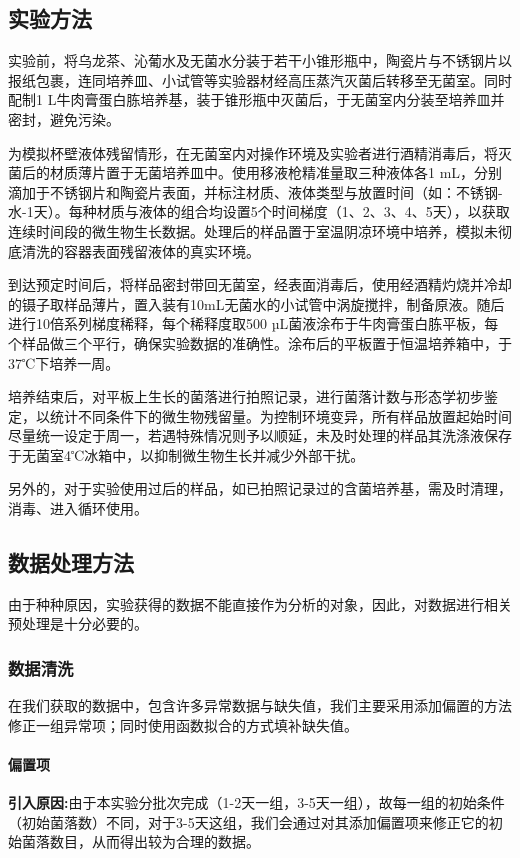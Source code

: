 \documentclass[12pt,a4paper]{ctexart}
\begin{document}
\subsection{实验方法}
实验前，将乌龙茶、沁葡水及无菌水分装于若干小锥形瓶中，陶瓷片与不锈钢片以报纸包裹，连同培养皿、小试管等实验器材经高压蒸汽灭菌后转移至无菌室。同时配制1 L牛肉膏蛋白胨培养基，装于锥形瓶中灭菌后，于无菌室内分装至培养皿并密封，避免污染。

为模拟杯壁液体残留情形，在无菌室内对操作环境及实验者进行酒精消毒后，将灭菌后的材质薄片置于无菌培养皿中。使用移液枪精准量取三种液体各1 mL，分别滴加于不锈钢片和陶瓷片表面，并标注材质、液体类型与放置时间（如：不锈钢-水-1天）。每种材质与液体的组合均设置5个时间梯度（1、2、3、4、5天），以获取连续时间段的微生物生长数据。处理后的样品置于室温阴凉环境中培养，模拟未彻底清洗的容器表面残留液体的真实环境。

到达预定时间后，将样品密封带回无菌室，经表面消毒后，使用经酒精灼烧并冷却的镊子取样品薄片，置入装有10mL无菌水的小试管中涡旋搅拌，制备原液。随后进行10倍系列梯度稀释，每个稀释度取500 µL菌液涂布于牛肉膏蛋白胨平板，每个样品做三个平行，确保实验数据的准确性。涂布后的平板置于恒温培养箱中，于37℃下培养一周。

培养结束后，对平板上生长的菌落进行拍照记录，进行菌落计数与形态学初步鉴定，以统计不同条件下的微生物残留量。为控制环境变异，所有样品放置起始时间尽量统一设定于周一，若遇特殊情况则予以顺延，未及时处理的样品其洗涤液保存于无菌室4℃冰箱中，以抑制微生物生长并减少外部干扰。

另外的，对于实验使用过后的样品，如已拍照记录过的含菌培养基，需及时清理，消毒、进入循环使用。

\subsection{数据处理方法}
由于种种原因，实验获得的数据不能直接作为分析的对象，因此，对数据进行相关预处理是十分必要的。
\subsubsection{数据清洗}
在我们获取的数据中，包含许多异常数据与缺失值，我们主要采用添加偏置的方法修正一组异常项；同时使用函数拟合的方式填补缺失值。
\paragraph{偏置项}
\textbf{引入原因:}由于本实验分批次完成（1-2天一组，3-5天一组），故每一组的初始条件（初始菌落数）不同，对于3-5天这组，我们会通过对其添加偏置项来修正它的初始菌落数目，从而得出较为合理的数据。
\end{document}

